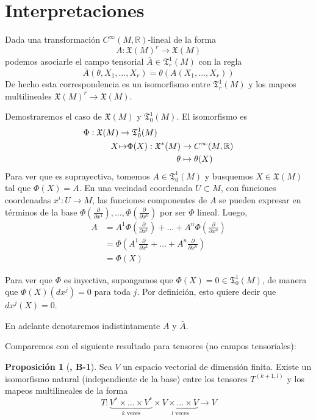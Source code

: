 \documentclass[spanish]{book}
\theoremstyle{definition}
\newtheorem*{prop}{Proposición}
\newcommand{\R}{\mathbb{R}}
\newcommand{\X}{\mathfrak{X}}
\newcommand{\T}{\mathfrak{T}}
\newcommand{\Cinf}{C^\infty}
\begin{document}
	\section{Interpretaciones}
	Dada una transformación $\Cinf(M,\R)$-lineal de la forma
	\[A:\X(M)^r\to\X(M)\]
	podemos asociarle el campo tensorial $\bar{A}\in\T^1_r(M)$ con la regla
	\[\bar{A}(\theta,X_1,\ldots,X_r)=\theta(A(X_1,\ldots,X_r))\]
	De hecho esta correspondencia es un isomorfismo entre $\T^1_r(M)$ y los mapeos multilineales $\X(M)^r\to\X(M)$.
	
	Demostraremos el caso de $\X(M)$ y $\T^1_0(M)$. El isomorfismo es
	\begin{align*}
		\Phi:\X(M)&\to\T^1_0(M)\\
		\begin{aligned}
			X\\\leavevmode
		\end{aligned}&
		\begin{aligned}
			\mapsto\\\leavevmode
		\end{aligned}
		\begin{aligned}
			\Phi(X):\X^*(M)&\to\Cinf(M,\R)\\
			\theta&\mapsto\theta(X)
		\end{aligned}
	\end{align*}
	Para ver que es suprayectiva, tomemos $A\in\T^1_0(M)$ y busquemos $X\in\X(M)$ tal que $\Phi(X)=A$. En una vecindad coordenada $U\subset M$, con funciones coordenadas $x^i:U\to M$, las funciones componentes de $A$ se pueden expresar en términos de la base $\Phi\left(\frac{\partial}{\partial x^1}\right),\ldots,\Phi\left(\frac{\partial}{\partial x^n}\right)$ por ser $\Phi$ lineal. Luego,
	\begin{align*}
		A&=A^1\Phi\left(\frac{\partial}{\partial x^1}\right)+\ldots+A^n\Phi\left(\frac{\partial}{\partial x^n}\right)\\
		&=\Phi\left(A^1\frac{\partial}{\partial x^1}+\ldots+A^n\frac{\partial}{\partial x^n}\right)\\
		&=\Phi(X)
	\end{align*}
	
	Para ver que $\Phi$ es inyectiva, supongamos que $\Phi(X)=0\in\T^1_0(M)$, de manera que $\Phi(X)(dx^j)=0$ para toda $j$. Por definición, esto quiere decir que $dx^j(X)=0$. 
	
	En adelante denotaremos indistintamente $A$ y $\bar{A}$.
	
	Comparemos con el siguiente resultado para tensores (no campos tensoriales):
	\begin{prop}[\cite{Lee-riem}\textbf{, B-1}]
		Sea $V$ un espacio vectorial de dimensión finita. Existe un isomorfismo natural (independiente de la base) entre los tensores $T^{(k+1,l)}$ y los mapeos multilineales de la forma
		\[T:\underbrace{V^*\times\ldots\times V^*}_{k\text{ veces}}\times \underbrace{V\times\ldots\times V}_{l\text{ veces}}\to V\]
	\end{prop}
	
\end{document}
